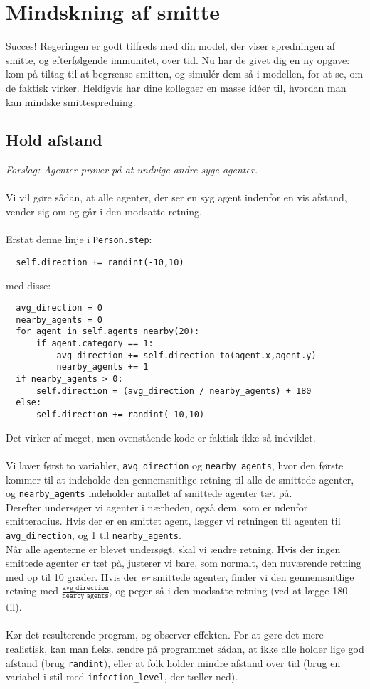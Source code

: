 \documentclass{article}
\begin{document}
\section{Mindskning af smitte}
Succes! Regeringen er godt tilfreds med din model, der viser spredningen af smitte, og efterfølgende immunitet, over tid. Nu har de givet dig en ny opgave: kom på tiltag til at begrænse smitten, og simulér dem så i modellen, for at se, om de faktisk virker. Heldigvis har dine kollegaer en masse idéer til, hvordan man kan mindske smittespredning.

\subsection{Hold afstand}
\textit{Forslag: Agenter prøver på at undvige andre syge agenter.}\\\\
Vi vil gøre sådan, at alle agenter, der ser en syg agent indenfor en vis afstand, vender sig om og går i den modsatte retning.\\\\
Erstat denne linje i \texttt{Person.step}:
\begin{lstlisting}
  self.direction += randint(-10,10)
\end{lstlisting}
med disse:
\begin{lstlisting}
  avg_direction = 0
  nearby_agents = 0
  for agent in self.agents_nearby(20):
      if agent.category == 1:
          avg_direction += self.direction_to(agent.x,agent.y)
          nearby_agents += 1
  if nearby_agents > 0:
      self.direction = (avg_direction / nearby_agents) + 180
  else:
      self.direction += randint(-10,10)
\end{lstlisting}
Det virker af meget, men ovenstående kode er faktisk ikke så indviklet.\\\\
Vi laver først to variabler, \texttt{avg\_direction} og \texttt{nearby\_agents}, hvor den første kommer til at indeholde den gennemsnitlige retning til alle de smittede agenter, og \texttt{nearby\_agents} indeholder antallet af smittede agenter tæt på.\\
Derefter undersøger vi agenter i nærheden, også dem, som er udenfor smitteradius. Hvis der er en smittet agent, lægger vi retningen til agenten til \texttt{avg\_direction}, og 1 til \texttt{nearby\_agents}.\\
Når alle agenterne er blevet undersøgt, skal vi ændre retning. Hvis der ingen smittede agenter er tæt på, justerer vi bare, som normalt, den nuværende retning med op til 10 grader. Hvis der \textit{er} smittede agenter, finder vi den gennemsnitlige retning med $\frac{\texttt{avg\_direction}}{\texttt{nearby\_agents}}$, og peger så i den modsatte retning (ved at lægge 180 til).\\\\
Kør det resulterende program, og observer effekten. For at gøre det mere realistisk, kan man f.eks. ændre på programmet sådan, at ikke alle holder lige god afstand (brug \texttt{randint}), eller at folk holder mindre afstand over tid (brug en variabel i stil med \texttt{infection\_level}, der tæller ned).
\end{document}
